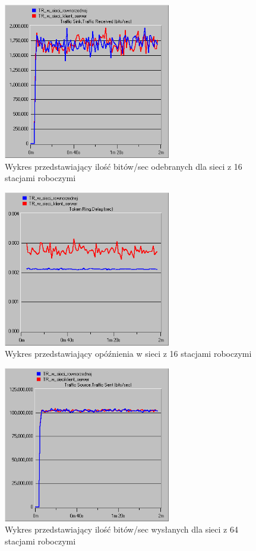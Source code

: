 \documentclass{article}
\begin{document}
\begin{figure}[H]
  \centering
  \includegraphics[width=0.65\textwidth]{screens/16_recv.png}
 \caption{Wykres przedstawiający ilość bitów/sec odebranych dla sieci z 16 stacjami roboczymi}
 \label{fig:16r}
\end{figure}

\begin{figure}[H]
  \centering
  \includegraphics[width=0.65\textwidth]{screens/16_delay.png}
 \caption{Wykres przedstawiający opóźnienia w sieci z 16 stacjami roboczymi}
 \label{fig:16d}
\end{figure}

\begin{figure}[H]
  \centering
  \includegraphics[width=0.65\textwidth]{screens/64_sent.png}
 \caption{Wykres przedstawiający ilość bitów/sec wysłanych dla sieci z 64 stacjami roboczymi}
 \label{fig:64s}
\end{figure}
\end{document}
